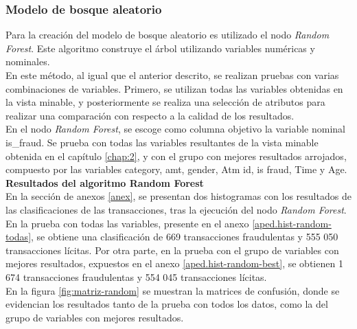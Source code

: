 \subsubsection{Modelo de bosque aleatorio}
Para la creación del modelo de bosque aleatorio es utilizado el nodo \textit{Random Forest}. Este algoritmo construye el árbol utilizando variables numéricas y nominales. \\
En este método, al igual que el anterior descrito, se realizan pruebas con varias combinaciones de variables. Primero, se utilizan todas las variables obtenidas en la vista minable, y posteriormente se realiza una selección de atributos para realizar una comparación con respecto a la calidad de los resultados. \\
En el nodo \textit{Random Forest}, se escoge como columna objetivo la variable nominal \textsf{is\_fraud}. Se prueba con todas las variables resultantes de la vista minable obtenida en el capítulo \ref{chap:2}, y con el grupo con mejores resultados arrojados, compuesto por las variables \textsf{category, amt, gender, Atm id, is fraud, Time y Age}. \\

\textbf{Resultados del algoritmo Random Forest} \\
En la sección de anexos \ref{anex}, se presentan dos histogramas con los resultados de las clasificaciones de las transacciones, tras la ejecución del nodo \textit{Random Forest}. En la prueba con todas las variables, presente en el anexo \ref{aped.hist-random-todas}, se obtiene una clasificación de 669 transacciones fraudulentas y 555 050 transacciones lícitas. Por otra parte, en la prueba con el grupo de variables con mejores resultados, expuestos en el anexo \ref{aped.hist-random-best}, se obtienen 1 674 transacciones fraudulentas y 554 045 transacciones lícitas. \\ 
En la figura  \ref{fig:matriz-random} se muestran la matrices de confusión, donde se evidencian los resultados tanto de la prueba con todos los datos, como la del grupo de variables con mejores resultados.

